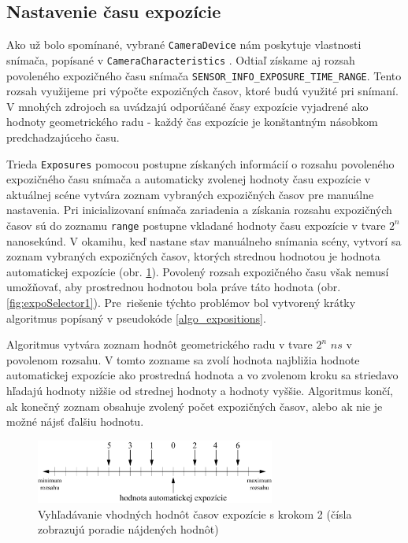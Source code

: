 \subsection{Nastavenie času expozície}
\label{sec:Practice-ExpoSelector}

Ako už bolo spomínané, vybrané \texttt{CameraDevice} nám poskytuje vlastnosti snímača, popísané 
v \texttt{CameraCharacteristics} \cite{Android}. Odtiaľ získame aj rozsah povoleného expozičného času snímača 
\texttt{SENSOR\_INFO\_EXPOSURE\_TIME\_RANGE}. Tento rozsah využijeme pri výpočte expozičných časov,
ktoré budú využité pri snímaní. V mnohých zdrojoch sa uvádzajú odporúčané časy expozície vyjadrené ako
hodnoty geometrického radu - každý čas expozície je konštantným násobkom predchadzajúceho času.

Trieda \texttt{Exposures} pomocou postupne získaných informácií o rozsahu povoleného expozičného času snímača
a automaticky zvolenej hodnoty času expozície v aktuálnej scéne vytvára zoznam vybraných expozičných časov pre manuálne
nastavenia. Pri inicializovaní snímača zariadenia a získania rozsahu expozičných časov sú do zoznamu \texttt{range}
postupne vkladané hodnoty času expozície v tvare $2^{n}$ nanosekúnd. V okamihu, keď nastane stav manuálneho snímania scény,
vytvorí sa zoznam vybraných expozičných časov, ktorých strednou hodnotou je hodnota automatickej expozície (obr. \ref{fig:expoSelector0}).
Povolený rozsah expozičného času však nemusí umožňovať, aby prostrednou hodnotou bola práve táto hodnota (obr. \ref{fig:expoSelector1}). 
Pre~riešenie týchto problémov bol vytvorený krátky algoritmus popísaný v pseudokóde \ref{algo_expositions}.

Algoritmus vytvára zoznam hodnôt geometrického radu v tvare $2^{n}$ $ns$ v povolenom rozsahu.
V tomto zozname sa zvolí hodnota najbližia hodnote automatickej expozície ako prostredná hodnota
a vo zvolenom kroku sa striedavo hľadajú hodnoty nižšie od strednej hodnoty a hodnoty vyššie.
Algoritmus končí, ak konečný zoznam obsahuje zvolený počet expozičných časov, alebo ak nie je
možné nájsť ďalšiu hodnotu.

\begin{figure}[h!]
    \centering
    \includegraphics[width=0.7\textwidth]{figures/capturing/expoSelector0}
    \caption{Vyhľadávanie vhodných hodnôt časov expozície s krokom 2 (čísla zobrazujú poradie nájdených hodnôt)}
    \label{fig:expoSelector0}
\end{figure}


